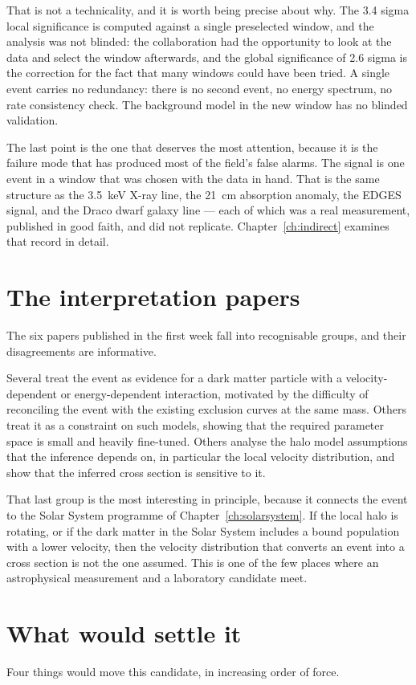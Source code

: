That is not a technicality, and it is worth being precise about why. The
3.4 sigma local significance is computed against a single preselected
window, and the analysis was not blinded: the collaboration had the
opportunity to look at the data and select the window afterwards, and the
global significance of 2.6 sigma is the correction for the fact that many
windows could have been tried. A single event carries no redundancy: there
is no second event, no energy spectrum, no rate consistency check. The
background model in the new window has no blinded validation.

The last point is the one that deserves the most attention, because it is
the failure mode that has produced most of the field's false alarms. The
signal is one event in a window that was chosen with the data in hand. That
is the same structure as the 3.5~keV X-ray line, the 21~cm absorption
anomaly, the EDGES signal, and the Draco dwarf galaxy line --- each of
which was a real measurement, published in good faith, and did not
replicate. Chapter~\ref{ch:indirect} examines that record in detail.

\section{The interpretation papers}The six papers published in the first week fall into
recognisable groups, and their disagreements are informative.

Several treat the event as evidence for a dark matter particle with a
velocity-dependent or energy-dependent interaction, motivated by the
difficulty of reconciling the event with the existing exclusion curves at
the same mass. Others treat it as a constraint on such models, showing that
the required parameter space is small and heavily fine-tuned. Others analyse
the halo model assumptions that the inference depends on, in particular the
local velocity distribution, and show that the inferred cross section is
sensitive to it.

That last group is the most interesting in principle, because it connects
the event to the Solar System programme of Chapter~\ref{ch:solarsystem}. If
the local halo is rotating, or if the dark matter in the Solar System
includes a bound population with a lower velocity, then the velocity
distribution that converts an event into a cross section is not the one
assumed. This is one of the few places where an astrophysical measurement
and a laboratory candidate meet.

\section{What would settle it}Four things would move this candidate, in
increasing order of force.

